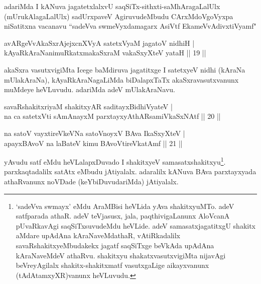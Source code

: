 \begin{artha}
adariMda I kANuva jagatetxlalxvU saqSiTx-sithxti-saMhAragaLalUlx (mUrukAlagaLalUlx) sadUrxpaveV AgiruvudeMbudu CArxMdoVgoVyxpa niSatitxna vacanavu ``sadeVva swmeVyxdamagarx AsiVtf EkameVvAdivxtiVyamf" 
\end{artha}

\begin{shl}
avARgeVvAkaSxrAjejxcnXVyA satetxVyaM jagatoV nidhiH |\\
kAyaRkAraNanimuRkatxmakaSxraM vakaSxyXteV yataH \hfill || 19 ||
\end{shl}

\begin{artha}
akaSxra vasutxvigiMta Icege baMdiruva jagatitxge I satetxyeV nidhi (kAraNa mUlakAraNa), kAyaRkAraNagaLiMda biDalapxTaTx akaSxravasutxvanunx muMdeye heVLuvudu. adariMda adeV mUlakAraNavu.
\end{artha}

\begin{shl}
savaRshakitxriyaM shakitxyAR saditayxBidhiVyateV |\\
na ca satetxVti \footnotemark[1]{}sAmAnayxM parxtayxyAthARsamiVkaSxNAtf \hfill || 20 ||
\end{shl}

\begin{shl}
na satoV vayxtireVkeVNa satoV\s noyxV BAva IkaSxyXteV |\\
apayxBAvoV na laBateV kimu BAvoV\s tireVkatAmf \hfill || 21 ||
\end{shl}

\begin{artha}
yAvudu satf eMdu heVLalapxDuvado I shakitxyeV samasatxshakitxyu\footnote[2]{`sadeVva swmayx' eMdu AraMBisi heVLida yAva shakitxyuMTo.  adeV satfparada athaR. adeV teVjasusx, jala, paqthivigaLanunx AloVcanA pUvaRkavAgi saqSiTxsuvudeMdu heVLide. adeV samasatxjagatitxgU shakitx aMdare upAdAna kAraNaveMdathaR, vAtiRkadalilx savaRshakitxyeMbudakekx jagatf saqSiTxge beVkAda upAdAna kAraNaveMdeV athaRvu. shakitxyu shakatxvasutxvigiMta nijavAgi beVreyAgilalx shakitx-shakitxmatf vasutxgaLige aikayxvanunx (tAdAtamxyXR)vanunx heVLuvudu.}. parxkaqtadalilx satAtx eMbudu jAtiyalalx. adaralilx kANuva BAva parxtayxyada athaRvanunx noVDade (keYbiDuvudariMda) jAtiyalalx.
\end{artha}


